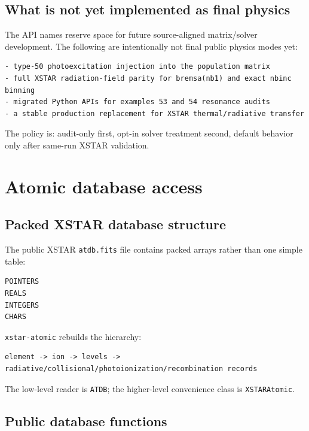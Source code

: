 \documentclass[11pt]{article}
\begin{document}
\subsection{What is not yet implemented as final physics}

The API names reserve space for future source-aligned matrix/solver development. The following are intentionally not final public physics modes yet:

\begin{lstlisting}[style=ctterminal]
- type-50 photoexcitation injection into the population matrix
- full XSTAR radiation-field parity for bremsa(nb1) and exact nbinc binning
- migrated Python APIs for examples 53 and 54 resonance audits
- a stable production replacement for XSTAR thermal/radiative transfer
\end{lstlisting}

The policy is: audit-only first, opt-in solver treatment second, default behavior only after same-run XSTAR validation.

\section{Atomic database access}

\subsection{Packed XSTAR database structure}

The public XSTAR \texttt{atdb.fits} file contains packed arrays rather than one simple table:

\begin{lstlisting}[style=ctterminal]
POINTERS
REALS
INTEGERS
CHARS
\end{lstlisting}

\texttt{xstar-atomic} rebuilds the hierarchy:

\begin{lstlisting}[style=ctterminal]
element -> ion -> levels -> radiative/collisional/photoionization/recombination records
\end{lstlisting}

The low-level reader is \texttt{ATDB}; the higher-level convenience class is \texttt{XSTARAtomic}.

\subsection{Public database functions}
\end{document}
